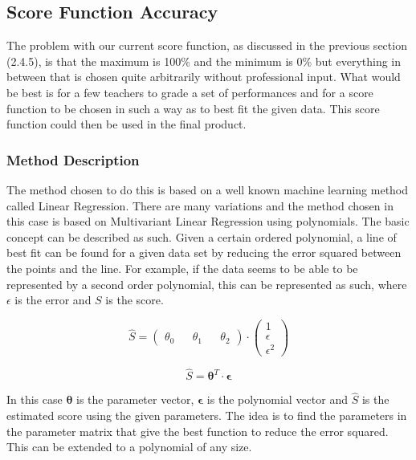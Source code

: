 \documentclass[11pt,a4paper]{article}
\begin{document}
\subsection{Score Function Accuracy}
\noindent
The problem with our current score function, as discussed in the previous section (2.4.5), is that the maximum is 100\% and the minimum is 0\% but everything in between that is chosen quite arbitrarily without professional input. What would be best is for a few  teachers to grade a set of performances and for a score function to be chosen in such a way as to best fit the given data. This score function could then be used in the final product.
\subsubsection{Method Description}
\noindent
The method chosen to do this is based on a well known machine learning method called Linear Regression. There are many variations and the method chosen in this case is based on Multivariant Linear Regression using polynomials. The basic concept can be described as such. Given a certain ordered polynomial, a line of best fit can be found for a given data set by reducing the error squared between the points and the line. For example, if the data seems to be able to be represented by a second order polynomial, this can be represented as such, where $\epsilon$ is the error and $S$ is the score.



\begin{equation}
\hat{S} = \begin{pmatrix}
  \theta_0 &&
  \theta_1 &&
  \theta_2
 \end{pmatrix}
 \cdot
 \begin{pmatrix}
   1 \\
   \epsilon\\
   \epsilon^2
 \end{pmatrix}
\end{equation} 

\begin{equation}
\hat{S} = \boldsymbol \theta^T \cdot \boldsymbol \epsilon
\end{equation} 


\noindent
In this case $\boldsymbol \theta$ is the parameter vector, $\boldsymbol \epsilon$ is the polynomial vector and $\hat{S} $ is the estimated score using the given parameters. The idea is to find the parameters in the parameter matrix that give the best function to reduce the error squared. This can be extended to a polynomial of any size.
 
\end{document}
